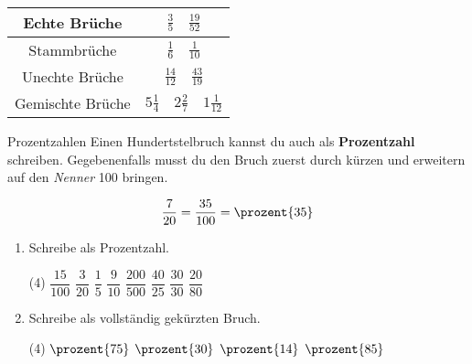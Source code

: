 \documentclass[lerntheke,12pt,a5paper,landscape]{arbeitsblatt}
\begin{document}
	\begin{loesungskarte}
		\begin{center}
			\begin{tabular}{|c|c|}\hline
				Echte Brüche & $\tfrac{3}{5}\quad \tfrac{19}{52}$ \\\hline
				Stammbrüche & $\tfrac{1}{6}\quad \tfrac{1}{10}$ \\\hline
				Unechte Brüche & $\tfrac{14}{12}\quad \tfrac{43}{19}$ \\\hline
				Gemischte Brüche & $5\tfrac{1}{4}\quad 2\tfrac{2}{7}\quad 1\tfrac{1}{12}$ \\\hline
			\end{tabular}
		\end{center}
	\end{loesungskarte}

	\begin{karte1}{Prozentzahlen}
		Einen Hundertstelbruch kannst du auch als \textbf{Prozentzahl} schreiben. Gegebenenfalls musst du den Bruch zuerst durch kürzen und erweitern auf den \emph{Nenner} \num{100} bringen.

		\[ \frac{7}{20} = \frac{35}{100} = \prozent{35} \]

		\begin{enumerate}
			\item Schreibe als Prozentzahl.
			\begin{tasks}(4)
				\task $\dfrac{15}{100}$
				\task $\dfrac{3}{20}$
				\task $\dfrac{1}{5}$
				\task $\dfrac{9}{10}$
				\task $\dfrac{200}{500}$
				\task $\dfrac{40}{25}$
				\task $\dfrac{30}{30}$
				\task $\dfrac{20}{80}$
			\end{tasks}

			\item Schreibe als vollständig gekürzten Bruch.
			\begin{tasks}(4)
				\task $\prozent{75}$
				\task $\prozent{30}$
				\task $\prozent{14}$
				\task $\prozent{85}$
			\end{tasks}
		\end{enumerate}
	\end{karte1}
\end{document}
